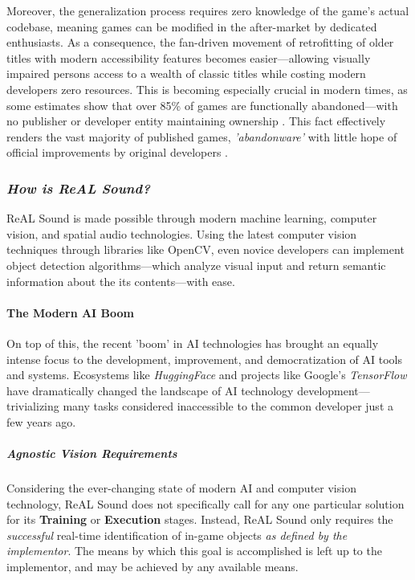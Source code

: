 \documentclass{report}
\newcommand{\rs}{ReAL Sound\xspace}
\begin{document}
Moreover, the generalization process requires zero knowledge of the game's actual codebase, meaning games can be modified in the after-market by dedicated enthusiasts. As a consequence, the fan-driven movement of retrofitting of older titles with modern accessibility features becomes easier---allowing visually impaired persons access to a wealth of classic titles while costing modern developers zero resources. This is becoming especially crucial in modern times, as some estimates show that over 85\% of games are functionally abandoned---with no publisher or developer entity maintaining ownership \cite{Lewin_2023}. This fact effectively renders the vast majority of published games, \emph{'abandonware'} with little hope of official improvements by original developers \cite{Costikyan_2000}.

\subsubsection{\emph{How is \rs?}}
\rs is made possible through modern machine learning, computer vision, and spatial audio technologies. Using the latest computer vision techniques through libraries like OpenCV\cite{opencv_library}, even novice developers can implement object detection algorithms---which analyze visual input and return semantic information about the its contents---with ease. 

\paragraph{The Modern AI Boom}

On top of this, the recent 'boom' in AI technologies\cite{Knight_2023}\cite{Meredith_2023} has brought an equally intense focus to the development, improvement, and democratization of AI tools and systems\cite{Brynjolfsson_McAfee_2017}\cite{Heikkilä_2022}. Ecosystems like \emph{HuggingFace}\cite{Wiggers_2022} and projects like Google's \emph{TensorFlow}\cite{tensorflow2015-whitepaper} have dramatically changed the landscape of AI technology development---trivializing many tasks considered inaccessible to the common developer just a few years ago.

\subparagraph{Agnostic Vision Requirements}

Considering the ever-changing state of modern AI and computer vision technology, \rs does not specifically call for any one particular solution for its \textbf{Training} or \textbf{Execution} stages. Instead, \rs only requires the \emph{successful} real-time identification of in-game objects \textit{as defined by the implementor}. The means by which this goal is accomplished is left up to the implementor, and may be achieved by any available means. 
\end{document}
